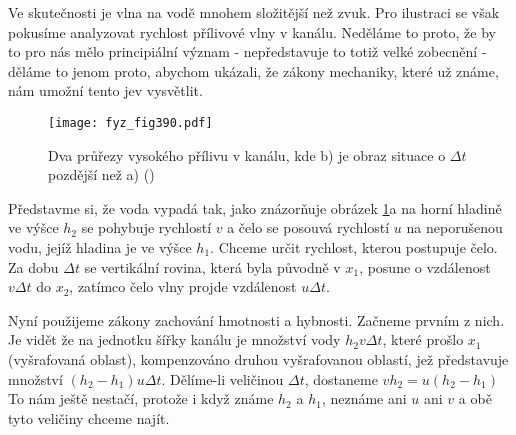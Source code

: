   Ve skutečnosti je vlna na vodě mnohem složitější než zvuk. Pro ilustraci se však pokusíme 
  analyzovat rychlost přílivové vlny v kanálu. Neděláme to proto, že by to pro nás mělo 
  principiální význam - nepředstavuje to totiž velké zobecnění - děláme to jenom proto, abychom 
  ukázali, že zákony mechaniky, které už známe, nám umožní tento jev vysvětlit. 
  
  \begin{figure}[ht!] %
    \centering
    \texttt{[image: fyz\_fig390.pdf]}
    \caption{Dva průřezy vysokého přílivu v kanálu, kde b) je obraz situace o \(\Delta t\)
                 pozdější než a)
             (\cite[s.~689]{Feynman01})}
    \label{fyz:fig390}
  \end{figure}
  
  Představme si, že voda vypadá tak, jako znázorňuje obrázek \ref{fyz:fig390}a na horní hladině ve 
  výšce \(h_2\) se pohybuje rychlostí \(v\) a čelo se posouvá rychlostí \(u\) na neporušenou vodu, 
  jejíž hladina je ve výšce \(h_1\). Chceme určit rychlost, kterou postupuje čelo. Za dobu \(\Delta 
  t\) se vertikální rovina, která byla původně v \(x_1\), posune o vzdálenost \(v\Delta t\) do 
  \(x_2\), zatímco čelo vlny projde vzdálenost \(u\Delta t\).
  
  Nyní použijeme zákony zachování hmotnosti a hybnosti. Začneme prvním z nich. Je vidět že na 
  jednotku šířky kanálu je množství vody \(h_2v\Delta t\), které prošlo \(x_1\) (vyšrafovaná 
  oblast), kompenzováno druhou vyšrafovanou oblastí, jež představuje množství \((h_2-h_1)u\Delta 
  t\). Dělíme-li veličinou \(\Delta t\), dostaneme \(vh_2=u(h_2-h_1)\) To nám ještě nestačí, 
  protože i když známe \(h_2\) a \(h_1\), neznáme ani \(u\) ani \(v\) a obě tyto veličiny chceme 
  najít. 
  
